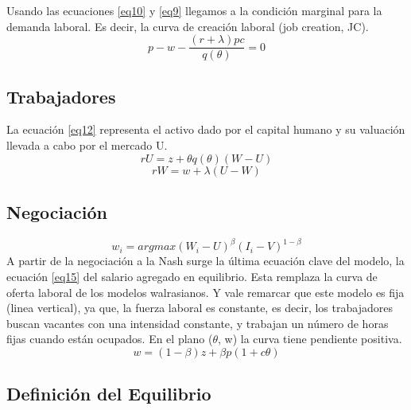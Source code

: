 \documentclass[12pt,oneside]{reedthesis}
\begin{document}
Usando las ecuaciones \eqref{eq10} y \eqref{eq9} llegamos a la condición marginal para la demanda laboral. Es decir, la curva de creación laboral (job creation, JC).
\begin{equation} \label{eq11}
p - w  - \frac{(r+\lambda)pc}{q(\theta)} = 0
\end{equation}
\subsection{Trabajadores}

La ecuación \eqref{eq12} representa el activo dado por el capital humano y su valuación llevada a cabo por el mercado U.
\begin{equation} \label{eq12}
rU = z + \theta q(\theta)(W-U)
\end{equation}
\begin{equation} \label{eq13}
rW = w + \lambda(U-W)
\end{equation}
\subsection{Negociación}
\begin{equation} \label{eq14}
w_i = argmax (W_{i} - U)^{\beta} (I_{i}-V)^{1-\beta}
\end{equation}
A partir de la negociación a la Nash surge la última ecuación clave del modelo, la ecuación \eqref{eq15} del salario agregado en equilibrio. Esta remplaza la curva de oferta laboral de los modelos walrasianos. Y vale remarcar que este modelo es fija (linea vertical), ya que, la fuerza laboral es constante, es decir, los trabajadores buscan vacantes con una intensidad constante, y trabajan un número de horas fijas cuando están ocupados. En el plano (\(\theta\), w) la curva tiene pendiente positiva.
\begin{equation} \label{eq15}
w = (1 - \beta)z + \beta p(1 + c\theta)
\end{equation}
\subsection{Definición del Equilibrio}
\end{document}
